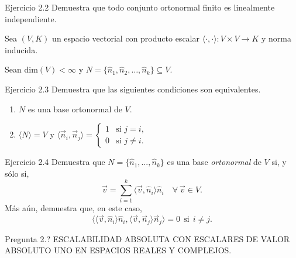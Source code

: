 \documentclass[12pt,dvipsnames]{article}
\numberwithin{equation}{section}
\begin{document}
%
%
%

Ejercicio 2.2 Demuestra que todo conjunto ortonormal finito es linealmente independiente. \\

\begin{center}
    Sea $(V,K)$ un espacio vectorial con producto escalar $\langle \cdot , \cdot \rangle:V\times V\to K$ y norma inducida.

    Sean $\text{dim}(V)<\infty$ y $N=\{\hat{n}_1, \hat{n}_2, \dots, \hat{n}_k\}\subseteq V$.
\end{center}

Ejercicio 2.3 Demuestra que las siguientes condiciones son equivalentes.
\begin{enumerate}[label=(\alph*)]

    \item $N$ es una base ortonormal de $V$.

    \item $\langle N \rangle = V$ y $ \langle \vec{n}_i , \vec{n}_j \rangle = \begin{cases} 1 &\text{si } j=i, \\ 0 &\text{si } j\neq i. \end{cases}$
\end{enumerate}

Ejercicio 2.4 Demuestra que $N=\{\hat{n}_1,...,\hat{n}_k\}$ es una base \emph{ortonormal} de $V$ si, y sólo si,
\[
    \vec{v} = \sum_{i=1}^k \langle \vec{v} , \hat{n}_i \rangle \hat{n}_i \quad \forall \ \vec{v}\in V.
\]
Más aún, demuestra que, en este caso,
\[
    \big \langle \langle \vec{v} , \hat{n}_i \rangle \hat{n}_i, \langle \vec{v} , \vec{n}_j \rangle \vec{n}_j \big \rangle = 0 \ \ \text{si} \ \ i\neq j.
\] 

Pregunta 2.? ESCALABILIDAD ABSOLUTA CON ESCALARES DE VALOR ABSOLUTO UNO EN ESPACIOS REALES Y COMPLEJOS.
\end{document}
